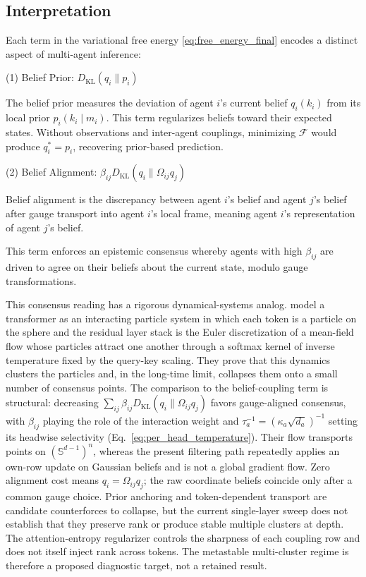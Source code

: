 \documentclass[twoside,11pt]{article}
\begin{document}
\subsection{Interpretation}

Each term in the variational free energy \eqref{eq:free_energy_final} encodes a distinct aspect of multi-agent inference:

(1) Belief Prior: $D_{\mathrm{KL}}(q_i \| p_i)$

The belief prior measures the deviation of agent $i$'s current belief $q_i(k_i)$ from its local prior $p_i(k_i \mid m_i)$. This term regularizes beliefs toward their expected states. Without observations and inter-agent couplings, minimizing $\mathcal{F}$ would produce $q_i^*=p_i$, recovering prior-based prediction.

(2) Belief Alignment: $\beta_{ij} D_{\mathrm{KL}}(q_i \| \Omega_{ij} q_j)$

Belief alignment is the discrepancy between agent $i$'s belief and agent $j$'s belief after gauge transport into agent $i$'s local frame, meaning agent $i$'s representation of agent $j$'s belief.

This term enforces an epistemic consensus whereby agents with high $\beta_{ij}$ are driven to agree on their beliefs about the current state, modulo gauge transformations.

This consensus reading has a rigorous dynamical-systems analog. \citet{geshkovski2023mathematical} model a transformer as an interacting particle system in which each token is a particle on the sphere and the residual layer stack is the Euler discretization of a mean-field flow whose particles attract one another through a softmax kernel of inverse temperature fixed by the query-key scaling. They prove that this dynamics clusters the particles and, in the long-time limit, collapses them onto a small number of consensus points. The comparison to the belief-coupling term is structural: decreasing $\sum_{ij} \beta_{ij} D_{\mathrm{KL}}(q_i \| \Omega_{ij} q_j)$ favors gauge-aligned consensus, with $\beta_{ij}$ playing the role of the interaction weight and $\tau_a^{-1}=(\kappa_a\sqrt{d_a})^{-1}$ setting its headwise selectivity (Eq.~\eqref{eq:per_head_temperature}). Their flow transports points on $(\mathbb{S}^{d-1})^n$, whereas the present filtering path repeatedly applies an own-row update on Gaussian beliefs and is not a global gradient flow. Zero alignment cost means $q_i=\Omega_{ij}q_j$; the raw coordinate beliefs coincide only after a common gauge choice. Prior anchoring and token-dependent transport are candidate counterforces to collapse, but the current single-layer sweep does not establish that they preserve rank or produce stable multiple clusters at depth. The attention-entropy regularizer controls the sharpness of each coupling row and does not itself inject rank across tokens. The metastable multi-cluster regime is therefore a proposed diagnostic target, not a retained result.
\end{document}
